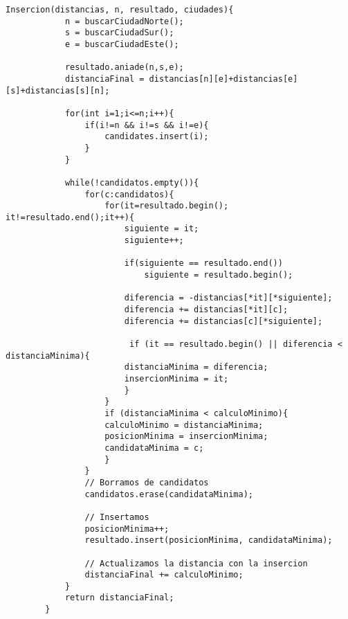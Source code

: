 \documentclass{article}
\begin{document}
	\begin{lstlisting}[caption=Pseudocódigo de la segunda heurística]
		Insercion(distancias, n, resultado, ciudades){
			n = buscarCiudadNorte();
			s = buscarCiudadSur();
			e = buscarCiudadEste();
			
			resultado.aniade(n,s,e);
			distanciaFinal = distancias[n][e]+distancias[e][s]+distancias[s][n];
			
			for(int i=1;i<=n;i++){
				if(i!=n && i!=s && i!=e){
					candidates.insert(i);
				}
			}
			
			while(!candidatos.empty()){
				for(c:candidatos){
					for(it=resultado.begin(); it!=resultado.end();it++){
						siguiente = it;
						siguiente++;
						
						if(siguiente == resultado.end())
							siguiente = resultado.begin();
							
						diferencia = -distancias[*it][*siguiente];
						diferencia += distancias[*it][c];
						diferencia += distancias[c][*siguiente];
						
						 if (it == resultado.begin() || diferencia < distanciaMinima){
						distanciaMinima = diferencia;
						insercionMinima = it;
						}
					}
					if (distanciaMinima < calculoMinimo){
					calculoMinimo = distanciaMinima;
					posicionMinima = insercionMinima;
					candidataMinima = c;
					}
				}
				// Borramos de candidatos
				candidatos.erase(candidataMinima);
				
				// Insertamos 
				posicionMinima++;
				resultado.insert(posicionMinima, candidataMinima);
				
				// Actualizamos la distancia con la insercion
				distanciaFinal += calculoMinimo;
			}
			return distanciaFinal;
		}
	\end{lstlisting}
\end{document}

